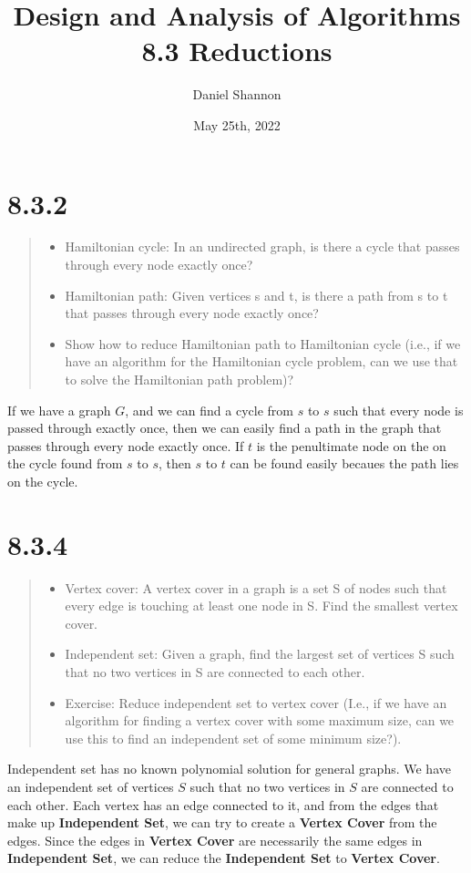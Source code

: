 \documentclass[12pt, letterpaper, twoside]{article}
\title{%
Design and Analysis of Algorithms\\
\large 8.3 Reductions
}
\author{Daniel Shannon}
\date{May 25th, 2022}
\begin{document}
\begin{titlepage}
\maketitle
\end{titlepage}

\section*{8.3.2}
\begin{quote}
\begin{itemize}
    \item Hamiltonian cycle: In an undirected graph, is there a cycle that passes through every node exactly once?
    \item Hamiltonian path: Given vertices s and t, is there a path from s to t that passes through every node exactly once?
    \item Show how to reduce Hamiltonian path to Hamiltonian cycle (i.e., if we have an algorithm for the Hamiltonian cycle problem, can we use that to solve the Hamiltonian path problem)?
\end{itemize}
\end{quote}

If we have a graph $G$, and we can find a cycle from $s$ to $s$
such that every node is passed through exactly once, then we can easily find a path in the graph 
that passes through every node exactly once. If $t$ is the penultimate node on the on the cycle found
from $s$ to $s$, then $s$ to $t$ can be found easily becaues the path lies on the cycle.

\section*{8.3.4}
\begin{quote}
\begin{itemize}
    \item Vertex cover: A vertex cover in a graph is a set S of nodes such that every edge is touching at least one node in S. Find the smallest vertex cover.
    \item Independent set: Given a graph, find the largest set of vertices S such that no two vertices in S are connected to each other.
    \item Exercise: Reduce independent set to vertex cover (I.e., if we have an algorithm for finding a vertex cover with some maximum size, can we use this to find an independent set of some minimum size?).
\end{itemize}
\end{quote}

Independent set has no known polynomial solution for general graphs. We have an 
independent set of vertices $S$ such that no two vertices in $S$ are connected to each other.
Each vertex has an edge connected to it, and from the edges that make up \textbf{Independent Set},
we can try to create a \textbf{Vertex Cover} from the edges. Since the edges in \textbf{Vertex Cover}
are necessarily the same edges in \textbf{Independent Set}, we can reduce the \textbf{Independent Set}
to \textbf{Vertex Cover}.
\end{document}
